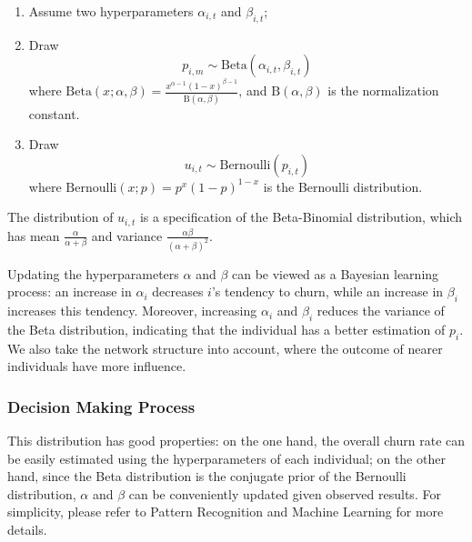 \documentclass[tcn = 37075, sheet = true, abstract = true]{mcmthesis}
\begin{document}
\begin{enumerate}
\item Assume two hyperparameters $\alpha_{i, t}$ and $\beta_{i, t}$;
\item Draw 
  \begin{equation}
   p_{i, m} \sim \mathrm{Beta}(\alpha_{i, t}, \beta_{i, t})
   \label{eq:beta}
  \end{equation}
  where $\displaystyle \mathrm{Beta}(x; \alpha, \beta) = \frac{x^{\alpha - 1}(1-x)^{\beta - 1}}{\mathrm{B}(\alpha, \beta)}$, and $\mathrm{B}(\alpha, \beta)$ is the normalization constant.
\item Draw 
  \begin{equation}
	u_{i, t} \sim \mathrm{Bernoulli}(p_{i, t})
    \label{eq:bernoulli}
  \end{equation}
  where $\mathrm{Bernoulli}(x; p) = p^x(1-p)^{1-x}$ is the Bernoulli distribution.
\end{enumerate}

The distribution of $u_{i, t}$ is a specification of the Beta-Binomial distribution, which has mean $\displaystyle \frac{\alpha}{\alpha + \beta}$ and variance $\displaystyle\frac{\alpha\beta}{(\alpha+\beta)^2}$. 

Updating the hyperparameters $\alpha$ and $\beta$ can be viewed as a Bayesian learning process: an increase in $\alpha_i$ decreases $i$'s tendency to churn, while an increase in $\beta_i$ increases this tendency. Moreover, increasing $\alpha_i$ and $\beta_i$ reduces the variance of the Beta distribution, indicating that the individual has a better estimation of $p_i$. We also take the network structure into account, where the outcome of nearer individuals have more influence.

\subsubsection{Decision Making Process}

This distribution has good properties: on the one hand, the overall churn rate can be easily estimated using the hyperparameters of each individual; on the other hand, since the Beta distribution is the conjugate prior of the Bernoulli distribution, $\alpha$ and $\beta$ can be conveniently updated given observed results. For simplicity, please refer to Pattern Recognition and Machine Learning for more details.
\end{document}
